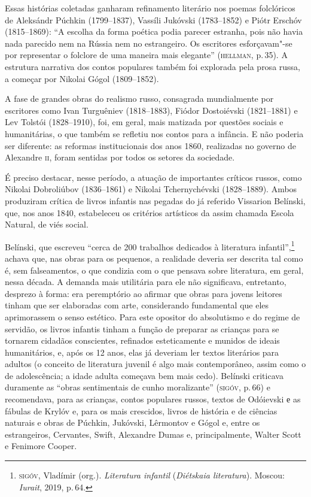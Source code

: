 Essas histórias coletadas ganharam refinamento literário nos poemas
folclóricos de Aleksándr Púchkin (1799--1837), Vassíli Jukóvski
(1783--1852) e Piótr Erschóv (1815--1869): ``A escolha da forma
poética podia parecer estranha, pois não havia nada parecido nem na
Rússia nem no estrangeiro. Os escritores esforçavam"-se por representar o
folclore de uma maneira mais elegante'' (\textsc{hellman}, p.\,35). A estrutura
narrativa dos contos populares também foi explorada pela prosa russa, a
começar por Nikolai Gógol (1809--1852).

A fase de grandes obras do realismo russo, consagrada mundialmente por
escritores como Ivan Turguêniev (1818--1883), Fiódor Dostoiévski
(1821--1881) e Lev Tolstói (1828--1910), foi, em geral, mais matizada
por questões sociais e humanitárias, o que também se refletiu nos contos
para a infância. E não poderia ser diferente: as reformas institucionais
dos anos 1860, realizadas no governo de Alexandre \textsc{ii}, foram sentidas por
todos os setores da sociedade.

É preciso destacar, nesse período, a atuação de importantes críticos
russos, como Nikolai Dobroliúbov (1836--1861) e Nikolai Tchernychévski
(1828--1889). Ambos produziram crítica de livros infantis nas pegadas do
já referido Vissarion Belínski, que, nos anos 1840, estabeleceu os
critérios artísticos da assim chamada Escola Natural, de viés social.

Belínski, que escreveu ``cerca de 200 trabalhos dedicados à literatura
infantil'',\footnote{\textsc{sigóv}, Vladímir (org.). \emph{Literatura infantil}
  (\emph{Diétskaia literatura}). Moscou: \emph{Iurait}, 2019, p.\,64.} achava
que, nas obras para os pequenos, a realidade deveria ser descrita tal
como é, sem falseamentos, o que condizia com o que pensava sobre
literatura, em geral, nessa década. A demanda mais utilitária para ele
não significava, entretanto, desprezo à forma: era peremptório ao
afirmar que obras para jovens leitores tinham que ser elaboradas com
arte, considerando fundamental que eles aprimorassem o senso estético.
Para este opositor do absolutismo e do regime de servidão, os livros
infantis tinham a função de preparar as crianças para se tornarem
cidadãos conscientes, refinados esteticamente e munidos de ideais
humanitários, e, após os 12 anos, elas já deveriam ler textos literários
para adultos (o conceito de literatura juvenil é algo mais contemporâneo,
assim como o de adolescência; a idade adulta começava bem mais cedo).
Belínski criticava duramente as ``obras sentimentais de cunho
moralizante'' (\textsc{sigóv}, p.\,66) e recomendava, para as crianças, contos
populares russos, textos de Odóievski е as fábulas de Krylóv e, para os
mais crescidos, livros de história e de ciências naturais e obras de
Púchkin, Jukóvski, Lêrmontov e Gógol e, entre os estrangeiros,
Cervantes, Swift, Alexandre Dumas e, principalmente, Walter Scott e
Fenimore Cooper.

